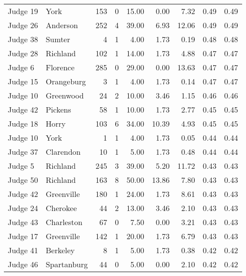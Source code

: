\begin{tabular}{llrrrrrrr}
Judge 19 &         York &   153 &      0 & 15.00 &       0.00 &      7.32 &         0.49 &      0.49 \\
Judge 26 &     Anderson &   252 &      4 & 39.00 &       6.93 &     12.06 &         0.49 &      0.49 \\
Judge 38 &       Sumter &     4 &      1 &  4.00 &       1.73 &      0.19 &         0.48 &      0.48 \\
Judge 28 &     Richland &   102 &      1 & 14.00 &       1.73 &      4.88 &         0.47 &      0.47 \\
 Judge 6 &     Florence &   285 &      0 & 29.00 &       0.00 &     13.63 &         0.47 &      0.47 \\
Judge 15 &   Orangeburg &     3 &      1 &  4.00 &       1.73 &      0.14 &         0.47 &      0.47 \\
Judge 10 &    Greenwood &    24 &      2 & 10.00 &       3.46 &      1.15 &         0.46 &      0.46 \\
Judge 42 &      Pickens &    58 &      1 & 10.00 &       1.73 &      2.77 &         0.45 &      0.45 \\
Judge 18 &        Horry &   103 &      6 & 34.00 &      10.39 &      4.93 &         0.45 &      0.45 \\
Judge 10 &         York &     1 &      1 &  4.00 &       1.73 &      0.05 &         0.44 &      0.44 \\
Judge 37 &    Clarendon &    10 &      1 &  5.00 &       1.73 &      0.48 &         0.44 &      0.44 \\
 Judge 5 &     Richland &   245 &      3 & 39.00 &       5.20 &     11.72 &         0.43 &      0.43 \\
Judge 50 &     Richland &   163 &      8 & 50.00 &      13.86 &      7.80 &         0.43 &      0.43 \\
Judge 42 &   Greenville &   180 &      1 & 24.00 &       1.73 &      8.61 &         0.43 &      0.43 \\
Judge 24 &     Cherokee &    44 &      2 & 13.00 &       3.46 &      2.10 &         0.43 &      0.43 \\
Judge 43 &   Charleston &    67 &      0 &  7.50 &       0.00 &      3.21 &         0.43 &      0.43 \\
Judge 17 &   Greenville &   142 &      1 & 20.00 &       1.73 &      6.79 &         0.43 &      0.43 \\
Judge 41 &     Berkeley &     8 &      1 &  5.00 &       1.73 &      0.38 &         0.42 &      0.42 \\
Judge 46 &  Spartanburg &    44 &      0 &  5.00 &       0.00 &      2.10 &         0.42 &      0.42 \\

\end{tabular}

